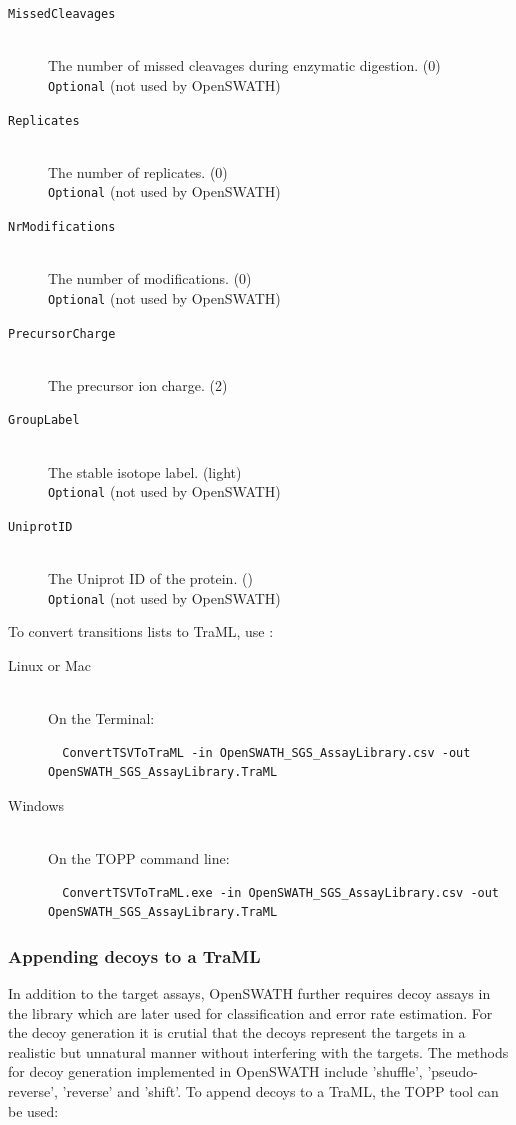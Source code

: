 \begin{description}
  \item[\texttt{MissedCleavages}] \hfill \\
  The number of missed cleavages during enzymatic digestion. (0)\\
  \texttt{Optional} (not used by OpenSWATH)
  \item[\texttt{Replicates}] \hfill \\
  The number of replicates. (0)\\
  \texttt{Optional} (not used by OpenSWATH)
  \item[\texttt{NrModifications}] \hfill \\
  The number of modifications. (0)\\
  \texttt{Optional} (not used by OpenSWATH)
  \item[\texttt{PrecursorCharge}] \hfill \\
  The precursor ion charge. (2)
  \item[\texttt{GroupLabel}] \hfill \\
  The stable isotope label. (light)\\
  \texttt{Optional} (not used by OpenSWATH)
  \item[\texttt{UniprotID}] \hfill \\
  The Uniprot ID of the protein. ()\\
  \texttt{Optional} (not used by OpenSWATH)
\end{description}

To convert transitions lists to TraML, use :\\

\begin{description}
  \item[Linux or Mac] \hfill \\
    On the Terminal:
    \begin{lstlisting}
  ConvertTSVToTraML -in OpenSWATH_SGS_AssayLibrary.csv -out OpenSWATH_SGS_AssayLibrary.TraML
  \end{lstlisting}
  \item[Windows] \hfill \\
    On the TOPP command line:
    \begin{lstlisting}
  ConvertTSVToTraML.exe -in OpenSWATH_SGS_AssayLibrary.csv -out OpenSWATH_SGS_AssayLibrary.TraML
  \end{lstlisting}
\end{description}

\subsubsection{Appending decoys to a TraML}
In addition to the target assays, OpenSWATH further requires decoy assays in the library which are later used for classification and error rate estimation. For the decoy generation it is crutial that the decoys represent the targets in a realistic but unnatural manner without interfering with the targets. The methods for decoy generation implemented in OpenSWATH include 'shuffle', 'pseudo-reverse', 'reverse' and 'shift'. To append decoys to a TraML, the TOPP tool  can be used:

